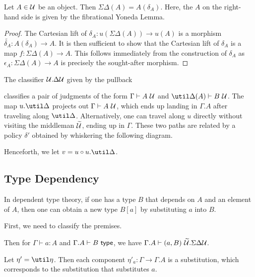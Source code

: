 \documentclass{amsart}
\begin{document}
\begin{lem}
  Let $A \in \mathcal{U}$ be an object.
  Then $\Sigma\Delta(A) = A(\delta_{A})$.
  Here, the $A$ on the right-hand side is given by the fibrational Yoneda Lemma.
\end{lem}
\begin{proof}
  The Cartesian lift of $\delta_{A} : u(\Sigma\Delta(A)) \to u(A)$ is a morphism $\widetilde{\delta_{A}} : A(\delta_{A}) \to A$.
  It is then sufficient to show that the Cartesian lift of $\delta_{A}$ is a map $f : \Sigma\Delta(A) \to A$.
  This follows immediately from the construction of $\delta_{A}$ as $\epsilon_{A} : \Sigma\Delta(A) \to A$ is precisely the sought-after morphism.
\end{proof}

The classifier $\mathcal{U}.\Delta\mathcal{U}$ given by the pullback

classifies a pair of judgments of the form $\Gamma \vdash A~\mathcal{U}$ and $\util\Delta(A) \vdash B~\Ty$.
The map $u.\util\Delta$ projects out $\Gamma \vdash A~\mathcal{U}$, which ends up landing in $\Gamma.A$ after traveling along $\util\Delta$.
Alternatively, one can travel along $u$ directly without visiting the middleman $\widetilde{\mathcal{U}}$, ending up in $\Gamma$.
These two paths are related by a policy $\delta'$ obtained by whiskering the following diagram.

Henceforth, we let $v = u \circ u.\util\Delta$.

\subsection{Type Dependency}
\label{sec:type-dependency}

In dependent type theory, if one has a type $B$ that depends on $A$ and an element of $A$, then one can obtain a new type $B[a]$ by substituting $a$ into $B$.
First, we need to classify the premises.

Then for $\Gamma \vdash a : A$ and $\Gamma.A \vdash B ~\mathsf{type}$, we have $\Gamma.A \vdash (a, B)~\widetilde{\mathcal{U}}.\Sigma\Delta\mathcal{U}$.

Let $\eta' = \util\eta$.
Then each component $\eta'_{a} : \Gamma \to \Gamma.A$ is a substitution, which corresponds to the substitution that substitutes $a$.

\end{document}

